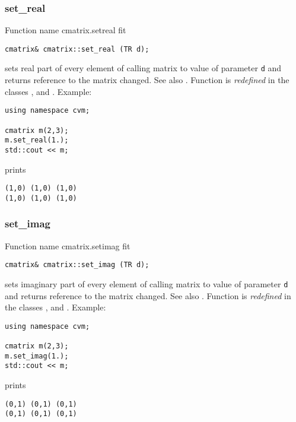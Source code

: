 \subsubsection{set\_real}
Function%
\pdfdest name {cmatrix.setreal} fit
\begin{verbatim}
cmatrix& cmatrix::set_real (TR d);
\end{verbatim}
sets real part of every element of  calling matrix to  value of
parameter \verb"d"
and returns  reference to the matrix changed.
See also .
Function is \emph{redefined} in the classes
,  
and .
Example:
\begin{Verbatim}
using namespace cvm;

cmatrix m(2,3);
m.set_real(1.);
std::cout << m;
\end{Verbatim}
prints
\begin{Verbatim}
(1,0) (1,0) (1,0)
(1,0) (1,0) (1,0)
\end{Verbatim}
\newpage



\subsubsection{set\_imag}
Function%
\pdfdest name {cmatrix.setimag} fit
\begin{verbatim}
cmatrix& cmatrix::set_imag (TR d);
\end{verbatim}
sets imaginary part of every element of  calling matrix to value of
parameter \verb"d"
and returns  reference to the matrix changed.
See also .
Function is \emph{redefined} in the classes
,  
and .
Example:
\begin{Verbatim}
using namespace cvm;

cmatrix m(2,3);
m.set_imag(1.);
std::cout << m;
\end{Verbatim}
prints
\begin{Verbatim}
(0,1) (0,1) (0,1)
(0,1) (0,1) (0,1)
\end{Verbatim}
\newpage



